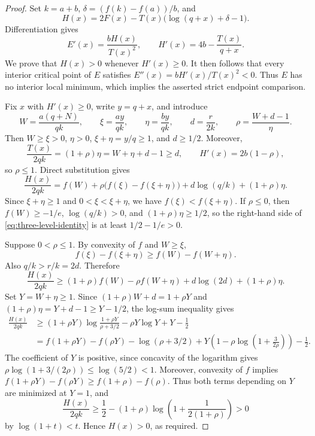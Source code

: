 \documentclass[11pt,a4paper,reqno]{amsart}
\theoremstyle{remark}
\numberwithin{equation}{section}
\begin{document}
\begin{proof}
Set $k=a+b$, $\delta=(f(k)-f(a))/b$, and
\begin{equation}\label{eq:three-level-H}
 H(x)=2F(x)-T(x)\bigl(\log(q+x)+\delta-1\bigr).
\end{equation}
Differentiation gives
\begin{equation}\label{eq:three-level-derivatives}
 E'(x)=\frac{bH(x)}{T(x)^2},\qquad
 H'(x)=4b-\frac{T(x)}{q+x}.
\end{equation}
We prove that $H(x)>0$ whenever $H'(x)\ge0$. It then follows that every
interior critical point of $E$ satisfies
$E''(x)=bH'(x)/T(x)^2<0$. Thus $E$ has no interior local minimum, which
implies the asserted strict endpoint comparison.

Fix $x$ with $H'(x)\ge0$, write $y=q+x$, and introduce
\[
 W=\frac{a(q+N)}{qk},\qquad
 \xi=\frac{ay}{qk},\qquad
 \eta=\frac{by}{qk},\qquad
 d=\frac{r}{2k},\qquad
 \rho=\frac{W+d-1}{\eta}.
\]
Then $W\ge\xi>0$, $\eta>0$, $\xi+\eta=y/q\ge1$, and $d\ge1/2$.
Moreover,
\[
 \frac{T(x)}{2qk}=(1+\rho)\eta=W+\eta+d-1\ge d,
 \qquad H'(x)=2b(1-\rho),
\]
so $\rho\le1$. Direct substitution gives
\begin{equation}\label{eq:three-level-identity}
 \frac{H(x)}{2qk}
 =f(W)+\rho\bigl(f(\xi)-f(\xi+\eta)\bigr)
       +d\log(q/k)+(1+\rho)\eta.
\end{equation}
Since $\xi+\eta\ge1$ and $0<\xi<\xi+\eta$, we have
$f(\xi)<f(\xi+\eta)$. If $\rho\le0$, then $f(W)\ge-1/e$,
$\log(q/k)>0$, and $(1+\rho)\eta\ge1/2$, so the right-hand side of
\eqref{eq:three-level-identity} is at least $1/2-1/e>0$.

Suppose $0<\rho\le1$. By convexity of $f$ and $W\ge\xi$,
\[
 f(\xi)-f(\xi+\eta)\ge f(W)-f(W+\eta).
\]
Also $q/k>r/k=2d$. Therefore
\[
 \frac{H(x)}{2qk}
 \ge(1+\rho)f(W)-\rho f(W+\eta)
          +d\log(2d)+(1+\rho)\eta.
\]
Set $Y=W+\eta\ge1$. Since
$(1+\rho)W+d=1+\rho Y$ and
$(1+\rho)\eta=Y+d-1\ge Y-1/2$, the log-sum inequality gives
\begin{align*}
 \frac{H(x)}{2qk}
 &\ge (1+\rho Y)\log\frac{1+\rho Y}{\rho+3/2}
       -\rho Y\log Y+Y-\frac12\\
 &=f(1+\rho Y)-f(\rho Y)-\log(\rho+3/2)
   +Y\left(1-\rho\log\left(1+\frac{3}{2\rho}\right)\right)
   -\frac12.
\end{align*}
The coefficient of $Y$ is positive, since concavity of the logarithm gives
$\rho\log(1+3/(2\rho))\le\log(5/2)<1$.
Moreover, convexity of $f$ implies
$f(1+\rho Y)-f(\rho Y)\ge f(1+\rho)-f(\rho)$.
Thus both terms depending on $Y$ are minimized at $Y=1$, and
\[
 \frac{H(x)}{2qk}
 \ge\frac12-(1+\rho)\log\left(1+\frac{1}{2(1+\rho)}\right)>0
\]
by $\log(1+t)<t$. Hence $H(x)>0$, as required.
\end{proof}
\end{document}
